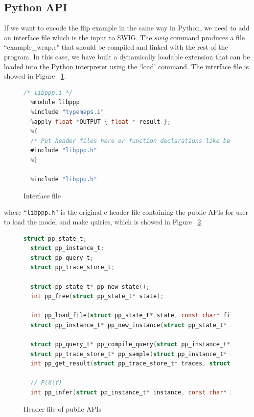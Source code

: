 \subsection{Python API}
If we want to encode the flip example in the same way in Python, we need to add an interface file which is the input to SWIG. The $swig$ command produces a file ``example\_wrap.c" that should be compiled and linked with the rest of the program. In this case, we have built a dynamically loadable extension that can be loaded into the Python interpreter using the `load' command. The interface file is showed in Figure ~\ref{fig:ifile}.

\begin{figure}[h]
\begin{lstlisting}[language=C]
  /* libppp.i */
  %module libppp
  %include "typemaps.i"
  %apply float *OUTPUT { float * result };
  %{
  /* Put header files here or function declarations like below */
  #include "libppp.h"
  %}

  %include "libppp.h"
\end{lstlisting}
\caption{Interface file}
\label{fig:ifile}
\end{figure}
where ``\texttt{libppp.h}'' is the original c header file containing the public APIs for user to load the model and make quiries, which is showed in Figure ~\ref{fig:libppp}.

\begin{figure}[h]
\begin{lstlisting}[language=C]
  struct pp_state_t;
  struct pp_instance_t;
  struct pp_query_t;
  struct pp_trace_store_t;
 
  struct pp_state_t* pp_new_state();
  int pp_free(struct pp_state_t* state);
 
  int pp_load_file(struct pp_state_t* state, const char* filename);
  struct pp_instance_t* pp_new_instance(struct pp_state_t* state, const char* model_name, int* model_params);
 
  struct pp_query_t* pp_compile_query(struct pp_instance_t* instance, const char* query_string);
  struct pp_trace_store_t* pp_sample(struct pp_instance_t* instance, struct pp_query_t* query);
  int pp_get_result(struct pp_trace_store_t* traces, struct pp_query_t* query, float* result);
 
  // P(X|Y)
  int pp_infer(struct pp_instance_t* instance, const char* X, const char* Y, float* result);
\end{lstlisting}
\caption{Header file of public APIs}
\label{fig:libppp}
\end{figure}

